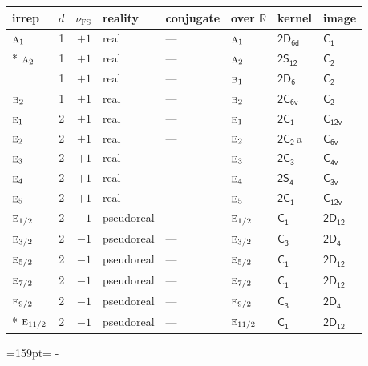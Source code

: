 \documentclass[10pt,a4paper]{article}
\makeatletter
\def\grouprule#1#2{\noalign{\marks\LTgroupmarks{\the\belowrulesep}\nobreak\vskip#1%
  \vskip\aboverulesep}\multispan\LT@cols\unskip{\leaders\hrule\@height#2\hfill\kern\z@}\cr
  \noalign{\penalty\LTrulebreak\vskip\belowrulesep\global\@lastruleclass\z@}}
\newcommand{\needspace}[1]{\par\penalty-100\begingroup\dimen0=#1\relax\dimen2=\pagegoal
  \advance\dimen2-\pagetotal\ifdim\dimen0>\dimen2\relax\ifdim\dimen2>0pt\vfil\break\fi\fi
  \endgroup}
\numberwithin{equation}{section}
\newcommand{\grp}[1]{\mathsf{#1}}
\newcommand{\irr}[1]{\text{\normalfont\scshape #1}}
\newcommand{\detbox}[1]{{\setlength{\fboxsep}{1pt}\fbox{#1}}}
\newcommand{\clsletter}[1]{\,{\scriptsize\color{black!55}#1}}
\newcommand{\fsind}{\nu_{\mathrm{FS}}}
\makeatother
\begin{document}
\setlength{\emergencystretch}{2em}\par\setlength{\emergencystretch}{0pt}
{\small\renewcommand{\arraystretch}{1.25}\setlength{\tabcolsep}{4pt}\begin{longtable}{@{}lrrlllll@{}}\toprule
irrep & $d$ & $\fsind$ & reality & conjugate & over $\mathbb{R}$ & kernel & image\\\midrule\endhead
\bottomrule\endfoot\endlastfoot
$\irr{a}_{1}$ & 1 & $+1$ & real & --- & $\irr{a}_{1}$ & \href{2D6d.pdf}{$\grp{2D_{6d}}$} & \href{../../../rotation/data/pdf/C1.pdf}{$\grp{C_{1}}$}\\*
$\irr{a}_{2}$ & 1 & $+1$ & real & --- & $\irr{a}_{2}$ & \href{2S12.pdf}{$\grp{2S_{12}}$} & \href{../../../rotation/data/pdf/C2.pdf}{$\grp{C_{2}}$}\\
\detbox{$\irr{b}_{1}$} & 1 & $+1$ & real & --- & $\irr{b}_{1}$ & \href{2D6.pdf}{$\grp{2D_{6}}$} & \href{../../../rotation/data/pdf/C2.pdf}{$\grp{C_{2}}$}\\
$\irr{b}_{2}$ & 1 & $+1$ & real & --- & $\irr{b}_{2}$ & \href{2C6v.pdf}{$\grp{2C_{6v}}$} & \href{../../../rotation/data/pdf/C2.pdf}{$\grp{C_{2}}$}\\
$\irr{e}_{1}$ & 2 & $+1$ & real & --- & $\irr{e}_{1}$ & \href{2C1.pdf}{$\grp{2C_{1}}$} & \href{../../../rotation/data/pdf/C12v.pdf}{$\grp{C_{12v}}$}\\
$\irr{e}_{2}$ & 2 & $+1$ & real & --- & $\irr{e}_{2}$ & \href{2C2.pdf}{$\grp{2C_{2}}$}\clsletter{a} & \href{../../../rotation/data/pdf/C6v.pdf}{$\grp{C_{6v}}$}\\
$\irr{e}_{3}$ & 2 & $+1$ & real & --- & $\irr{e}_{3}$ & \href{2C3.pdf}{$\grp{2C_{3}}$} & \href{../../../rotation/data/pdf/C4v.pdf}{$\grp{C_{4v}}$}\\
$\irr{e}_{4}$ & 2 & $+1$ & real & --- & $\irr{e}_{4}$ & \href{2S4.pdf}{$\grp{2S_{4}}$} & \href{../../../rotation/data/pdf/C3v.pdf}{$\grp{C_{3v}}$}\\
$\irr{e}_{5}$ & 2 & $+1$ & real & --- & $\irr{e}_{5}$ & \href{2C1.pdf}{$\grp{2C_{1}}$} & \href{../../../rotation/data/pdf/C12v.pdf}{$\grp{C_{12v}}$}\\
\grouprule{0pt}{\lightrulewidth}
$\irr{e}_{1/2}$ & 2 & $-1$ & pseudoreal & --- & $\irr{e}_{1/2}$ & \href{C1.pdf}{$\grp{C_{1}}$} & \href{2D12.pdf}{$\grp{2D_{12}}$}\\
$\irr{e}_{3/2}$ & 2 & $-1$ & pseudoreal & --- & $\irr{e}_{3/2}$ & \href{C3.pdf}{$\grp{C_{3}}$} & \href{2D4.pdf}{$\grp{2D_{4}}$}\\
$\irr{e}_{5/2}$ & 2 & $-1$ & pseudoreal & --- & $\irr{e}_{5/2}$ & \href{C1.pdf}{$\grp{C_{1}}$} & \href{2D12.pdf}{$\grp{2D_{12}}$}\\
$\irr{e}_{7/2}$ & 2 & $-1$ & pseudoreal & --- & $\irr{e}_{7/2}$ & \href{C1.pdf}{$\grp{C_{1}}$} & \href{2D12.pdf}{$\grp{2D_{12}}$}\\
$\irr{e}_{9/2}$ & 2 & $-1$ & pseudoreal & --- & $\irr{e}_{9/2}$ & \href{C3.pdf}{$\grp{C_{3}}$} & \href{2D4.pdf}{$\grp{2D_{4}}$}\\*
$\irr{e}_{11/2}$ & 2 & $-1$ & pseudoreal & --- & $\irr{e}_{11/2}$ & \href{C1.pdf}{$\grp{C_{1}}$} & \href{2D12.pdf}{$\grp{2D_{12}}$}\\
\bottomrule\end{longtable}}
\needspace{159pt}
\end{document}
